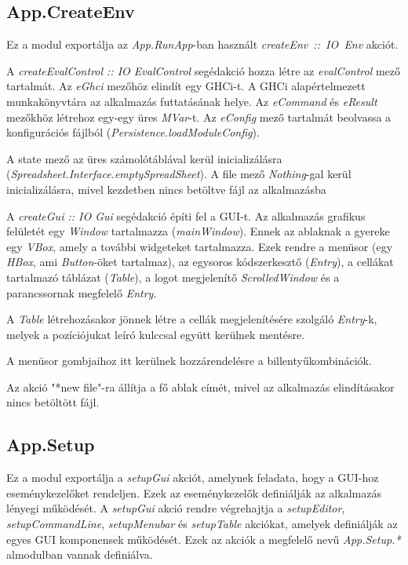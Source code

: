 \subsection{App.CreateEnv}

Ez a modul exportálja az \textit{App.RunApp}-ban használt \mbox{\textit{createEnv :: IO Env}} akciót.

A \textit{createEvalControl :: IO EvalControl} segédakció hozza létre az \textit{evalControl} mező tartalmát. Az \textit{eGhci} mezőhöz elindít egy GHCi-t. A GHCi alapértelmezett munkakönyvtára az alkalmazás futtatásának helye. Az \textit{eCommand} és \textit{eResult} mezőkhöz létrehoz egy-egy üres \textit{MVar}-t. Az \textit{eConfig} mező tartalmát beolvassa a konfigurációs fájlból (\textit{Persistence.loadModuleConfig}).

A state mező az üres számolótáblával kerül inicializálásra (\textit{Spreadsheet.Interface.emptySpreadSheet}). A file mező \textit{Nothing}-gal kerül inicializálásra, mivel kezdetben nincs betöltve fájl az alkalmazásba

A \textit{createGui :: IO Gui} segédakció építi fel a GUI-t. Az alkalmazás grafikus felületét egy \textit{Window} tartalmazza (\textit{mainWindow}). Ennek az ablaknak a gyereke egy \textit{VBox}, amely a további widgeteket tartalmazza.   Ezek rendre a menüsor (egy \textit{HBox}, ami \textit{Button}-öket tartalmaz),  az egysoros kódszerkesztő (\textit{Entry}), a cellákat tartalmazó táblázat (\textit{Table}), a logot megjelenítő \textit{ScrolledWindow} és a parancssornak megfelelő \textit{Entry}.

A \textit{Table} létrehozásakor jönnek létre a cellák megjelenítésére szolgáló \textit{Entry}-k, melyek a pozíciójukat leíró kulccsal együtt kerülnek mentésre.

A menüsor gombjaihoz itt kerülnek hozzárendelésre a billentyűkombinációk.

Az akció "*new file"-ra állítja a fő ablak címét, mivel az alkalmazás elindításakor nincs betöltött fájl.

\subsection{App.Setup}

Ez a modul exportálja a \textit{setupGui} akciót, amelynek feladata, hogy a GUI-hoz eseménykezelőket rendeljen. Ezek az eseménykezelők definiálják az alkalmazás lényegi működését. A \textit{setupGui} akció rendre végrehajtja a \textit{setupEditor}, \textit{setupCommandLine}, \textit{setupMenubar} és \textit{setupTable} akciókat, amelyek definiálják az egyes GUI komponensek működését. Ezek az akciók a megfelelő nevű \textit{App.Setup.*} almodulban vannak definiálva.

